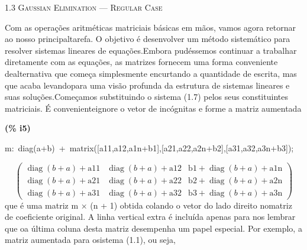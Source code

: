 \documentclass[fleqn]{article}
\begin{document}
\pagebreak{}
{\Huge {\scshape 1.3 Gaussian Elimination — Regular Case}}
\setcounter{section}{0}
\setcounter{subsection}{0}
\setcounter{figure}{0}

Com as operações aritméticas matriciais básicas em mãos, vamos agora retornar ao nosso principaltarefa. O objetivo é desenvolver um método sistemático para resolver sistemas lineares de equações.Embora pudéssemos continuar a trabalhar diretamente com as equações, as matrizes fornecem uma forma conveniente dealternativa que começa simplesmente encurtando a quantidade de escrita, mas que acaba levandopara uma visão profunda da estrutura de sistemas lineares e suas soluções.Começamos substituindo o sistema (1.7) pelos seus constituintes matriciais. É convenienteignore o vetor de incógnitas e forme a matriz aumentada


\noindent
\begin{minipage}[t]{4.000000em}\color{red}\bfseries
(\% i5)	
\end{minipage}
\begin{minipage}[t]{\textwidth}\color{blue}
m:\ diag(a+b)\ +\ matrix([a11,a12,a1n+b1],[a21,a22,a2n+b2],[a31,a32,a3n+b3]);
\end{minipage}
\[\displaystyle \tag{m} 
\begin{pmatrix}\mathop{diag}\left( b\mathop{+}a\right) \mathop{+}\ensuremath{\mathrm{a11}} & \mathop{diag}\left( b\mathop{+}a\right) \mathop{+}\ensuremath{\mathrm{a12}} & \ensuremath{\mathrm{b1}}\mathop{+}\mathop{diag}\left( b\mathop{+}a\right) \mathop{+}\ensuremath{\mathrm{a1n}}\\
\mathop{diag}\left( b\mathop{+}a\right) \mathop{+}\ensuremath{\mathrm{a21}} & \mathop{diag}\left( b\mathop{+}a\right) \mathop{+}\ensuremath{\mathrm{a22}} & \ensuremath{\mathrm{b2}}\mathop{+}\mathop{diag}\left( b\mathop{+}a\right) \mathop{+}\ensuremath{\mathrm{a2n}}\\
\mathop{diag}\left( b\mathop{+}a\right) \mathop{+}\ensuremath{\mathrm{a31}} & \mathop{diag}\left( b\mathop{+}a\right) \mathop{+}\ensuremath{\mathrm{a32}} & \ensuremath{\mathrm{b3}}\mathop{+}\mathop{diag}\left( b\mathop{+}a\right) \mathop{+}\ensuremath{\mathrm{a3n}}\end{pmatrix}\mbox{}
\]
que é uma matriz m × (n + 1) obtida colando o vetor do lado direito nomatriz de coeficiente original. A linha vertical extra é incluída apenas para nos lembrar que oa última coluna desta matriz desempenha um papel especial. Por exemplo, a matriz aumentada para osistema (1.1), ou seja,
\end{document}
